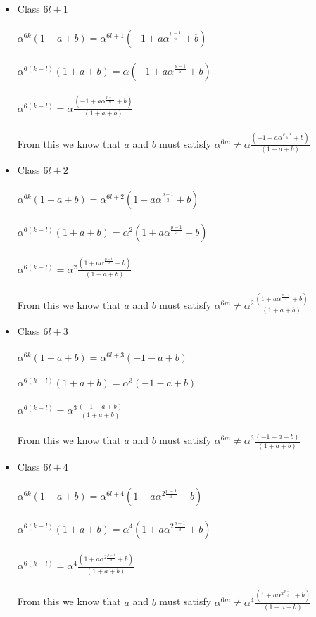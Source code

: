 \documentclass[12pt]{article}
\begin{document}
\begin{itemize}
	\item Class $6l+1$ \\ \\
		$\alpha^{6k}(1+a+b) = \alpha^{6l+1}(-1+a\alpha^{\frac{p-1}{6}}+b)$
		\\ \\
		$\alpha^{6(k-l)}(1+a+b) = \alpha(-1+a\alpha^{\frac{p-1}{6}}+b)$
		\\ \\
		$\alpha^{6(k-l)} =  \alpha \frac{(-1+a\alpha^{\frac{p-1}{6}}+b)}{(1+a+b)} $
		\\ \\
		From this we know that $a$ and $b$ must satisfy
		 $\alpha^{6m} \neq  \alpha \frac{(-1+a\alpha^{\frac{p-1}{6}}+b)}{(1+a+b)} $

	\item Class $6l+2$ \\ \\
		$\alpha^{6k}(1+a+b) = \alpha^{6l+2}(1+a\alpha^{\frac{p-1}{3}}+b)$
		\\ \\
		$\alpha^{6(k-l)}(1+a+b) = \alpha^{2}(1+a\alpha^{\frac{p-1}{3}}+b)$
		\\ \\
		$\alpha^{6(k-l)} = \alpha^{2}\frac{(1+a\alpha^{\frac{p-1}{3}}+b)}{(1+a+b)}$
		\\ \\
		From this we know that $a$ and $b$ must satisfy
		$\alpha^{6m} \neq \alpha^{2}\frac{(1+a\alpha^{\frac{p-1}{3}}+b)}{(1+a+b)}$

	\item Class $6l+3$ \\ \\
		$\alpha^{6k}(1+a+b) = \alpha^{6l+3}(-1-a+b)$
		\\ \\
		$\alpha^{6(k-l)}(1+a+b) = \alpha^{3}(-1-a+b)$
		\\ \\
		$\alpha^{6(k-l)} = \alpha^{3}\frac{(-1-a+b)}{(1+a+b)}$
		\\ \\
		From this we know that $a$ and $b$ must satisfy
		$\alpha^{6m} \neq \alpha^{3}\frac{(-1-a+b)}{(1+a+b)}$
	
	\item Class $6l+4$ \\ \\
		$\alpha^{6k}(1+a+b) = \alpha^{6l+4}(1+a\alpha^{2\frac{p-1}{3}}+b)$
		\\ \\
		$\alpha^{6(k-l)}(1+a+b) = \alpha^{4}(1+a\alpha^{2\frac{p-1}{3}}+b)$
		\\ \\
		$\alpha^{6(k-l)} = \alpha^{4}\frac{(1+a\alpha^{2\frac{p-1}{3}}+b)}{(1+a+b)}$
		\\ \\
		From this we know that $a$ and $b$ must satisfy $\alpha^{6m} \neq \alpha^{4}\frac{(1+a\alpha^{2\frac{p-1}{3}}+b)}{(1+a+b)}$


\end{itemize}
\end{document}
